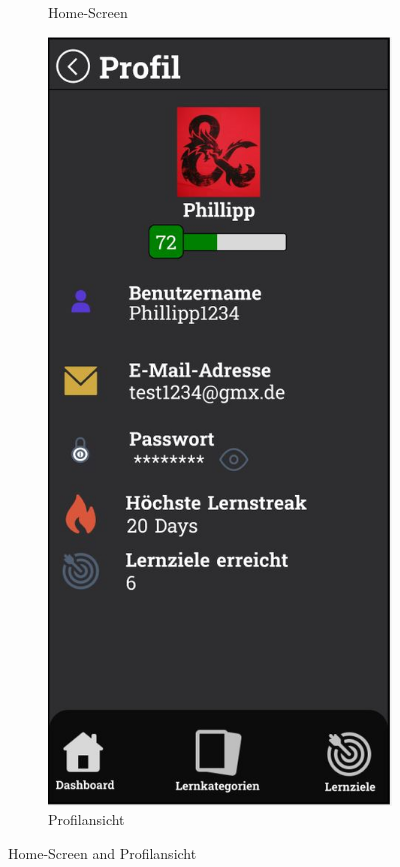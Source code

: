\begin{figure}[htbp]
\begin{subfigure}[b]{0.45\linewidth}
          \caption{Home-Screen}
          \label{fig:home-screen}
        \end{subfigure}
        \hfill
        \begin{subfigure}[b]{0.45\linewidth}
          \centering
          \includegraphics[width=\linewidth]{images/Mockups/Profile.JPG}
          \caption{Profilansicht}
          \label{fig:profilansicht}
        \end{subfigure}
        \caption{Home-Screen and Profilansicht}
      \end{figure}

